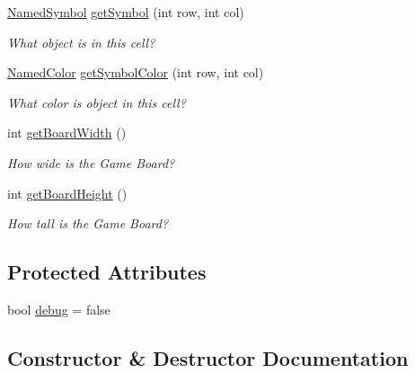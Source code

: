 \begin{DoxyCompactItemize}
\hyperlink{namespacebridges_1_1game_ab9a19c7ab6e2ebac2f95180e21733487}{Named\+Symbol} \hyperlink{classbridges_1_1game_1_1_game_base_a0dfec715b0ed49c37b4b6689f2470b25}{get\+Symbol} (int row, int col)
\begin{DoxyCompactList}\small\item\em What object is in this cell? \end{DoxyCompactList}\item 
\hyperlink{namespacebridges_1_1game_afaa832a4322b25b6a4ebfba832f10f26}{Named\+Color} \hyperlink{classbridges_1_1game_1_1_game_base_a26c9f9547cc6f992a829ce5d6edd8f85}{get\+Symbol\+Color} (int row, int col)
\begin{DoxyCompactList}\small\item\em What color is object in this cell? \end{DoxyCompactList}\item 
int \hyperlink{classbridges_1_1game_1_1_game_base_ad74bf992cced25e9997fbf8a63bf8157}{get\+Board\+Width} ()
\begin{DoxyCompactList}\small\item\em How wide is the Game Board? \end{DoxyCompactList}\item 
int \hyperlink{classbridges_1_1game_1_1_game_base_a14510d6685e0b224c8995e397ad64adc}{get\+Board\+Height} ()
\begin{DoxyCompactList}\small\item\em How tall is the Game Board? \end{DoxyCompactList}\end{DoxyCompactItemize}
\subsection*{Protected Attributes}
\begin{DoxyCompactItemize}
\item 
bool \hyperlink{classbridges_1_1game_1_1_game_base_ad2af01edd927a31613d3b881286541bb}{debug} = false
\end{DoxyCompactItemize}


\subsection{Constructor \& Destructor Documentation}
\mbox{\label{classbridges_1_1game_1_1_game_base_abd73825c57a10d28191a3f1162eb9bd8}} 
